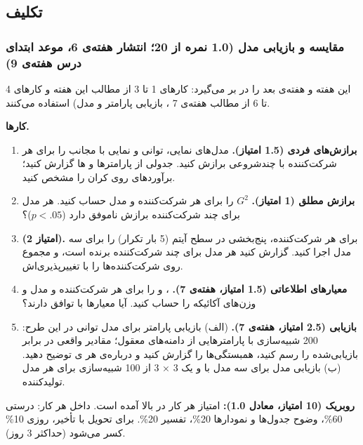 
\subsection{تکلیف}

\subsubsection{\texorpdfstring{ مقایسه و بازیابی مدل (1.0 نمره
از 20؛ انتشار هفته‌ی 6، موعد ابتدای درس هفته‌ی
9)}{A3: مقایسه و بازیابی مدل (1.0 نمره از 20؛ انتشار هفته‌ی 6، موعد ابتدای درس هفته‌ی 9)}}

 این هفته و هفته‌ی بعد را در بر می‌گیرد: کارهای 1 تا 3 از مطالب این
هفته و کارهای 4 تا 6 از مطالب هفته‌ی 7 ، بازیابی پارامتر و
مدل) استفاده می‌کنند.

\textbf{کارها.}

\begin{enumerate}
\def\labelenumi{\arabic{enumi}.}
\tightlist
\item
  \textbf{برازش‌های فردی (1.5 امتیاز).} مدل‌های نمایی، توانی و نمایی با
  مجانب را برای هر شرکت‌کننده با  چندشروعی برازش کنید. جدولی از
  پارامترها و ها گزارش کنید؛ برآوردهای روی کران را مشخص کنید.
\item
  \textbf{برازش مطلق (1 امتیاز).} \(G^2\) را برای هر شرکت‌کننده و مدل
  حساب کنید. هر مدل برای چند شرکت‌کننده برازش ناموفق دارد (\(p < .05\))؟
\item
  \textbf{ (2 امتیاز).} برای هر شرکت‌کننده، 
  پنج‌بخشی در سطح آیتم (5 بار تکرار) را برای سه مدل اجرا کنید. گزارش کنید
  هر مدل برای چند شرکت‌کننده برنده است، و مجموع  روی
  شرکت‌کننده‌ها را با تغییرپذیری‌اش.
\item
  \textbf{معیارهای اطلاعاتی (1.5 امتیاز، هفته‌ی 7).} ، 
  و  را برای هر شرکت‌کننده و مدل و وزن‌های آکائیکه را حساب کنید.
  آیا معیارها با  توافق دارند؟
\item
  \textbf{بازیابی (2.5 امتیاز، هفته‌ی 7).} (الف) بازیابی پارامتر برای مدل
  توانی در این طرح: 200 شبیه‌سازی با پارامترهایی از دامنه‌های معقول؛
  مقادیر واقعی در برابر بازیابی‌شده را رسم کنید، همبستگی‌ها را گزارش کنید
  و درباره‌ی هر ی توضیح دهید. (ب) بازیابی مدل برای سه مدل
  با  و  یک  3 × 3 از 100 شبیه‌سازی
  برای هر مدل تولیدکننده.
\end{enumerate}

\textbf{روبریک (10 امتیاز، معادل 1.0):} امتیاز هر کار در بالا آمده است.
داخل هر کار: درستی 60\%، وضوح جدول‌ها و نمودارها 20\%، تفسیر 20\%. برای
تحویل با تأخیر، روزی 10\% کسر می‌شود (حداکثر 3 روز).

